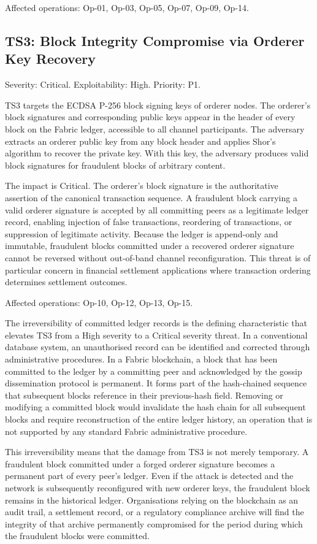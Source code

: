 \documentclass[conference]{IEEEtran}
\begin{document}
Affected operations: Op-01, Op-03, Op-05, Op-07, Op-09, Op-14.

\subsection{TS3: Block Integrity Compromise via Orderer Key Recovery}

Severity: Critical. Exploitability: High. Priority: P1.

TS3 targets the ECDSA P-256 block signing keys of orderer nodes. The
orderer's block signatures and corresponding public keys appear in the
header of every block on the Fabric ledger, accessible to all channel
participants. The adversary extracts an orderer public key from any block
header and applies Shor's algorithm to recover the private key. With this
key, the adversary produces valid block signatures for fraudulent blocks
of arbitrary content.

The impact is Critical. The orderer's block signature is the authoritative
assertion of the canonical transaction sequence. A fraudulent block
carrying a valid orderer signature is accepted by all committing peers as
a legitimate ledger record, enabling injection of false transactions,
reordering of transactions, or suppression of legitimate activity.
Because the ledger is append-only and immutable, fraudulent blocks
committed under a recovered orderer signature cannot be reversed without
out-of-band channel reconfiguration. This threat is of particular concern
in financial settlement applications where transaction ordering determines
settlement outcomes.

Affected operations: Op-10, Op-12, Op-13, Op-15.

The irreversibility of committed ledger records is the defining
characteristic that elevates TS3 from a High severity to a Critical severity
threat. In a conventional database system, an unauthorised record can be
identified and corrected through administrative procedures. In a Fabric
blockchain, a block that has been committed to the ledger by a committing
peer and acknowledged by the gossip dissemination protocol is permanent.
It forms part of the hash-chained sequence that subsequent blocks reference
in their previous-hash field. Removing or modifying a committed block would
invalidate the hash chain for all subsequent blocks and require
reconstruction of the entire ledger history, an operation that is not
supported by any standard Fabric administrative procedure.

This irreversibility means that the damage from TS3 is not merely
temporary. A fraudulent block committed under a forged orderer signature
becomes a permanent part of every peer's ledger. Even if the attack is
detected and the network is subsequently reconfigured with new orderer
keys, the fraudulent block remains in the historical ledger. Organisations
relying on the blockchain as an audit trail, a settlement record, or a
regulatory compliance archive will find the integrity of that archive
permanently compromised for the period during which the fraudulent blocks
were committed.
\end{document}
